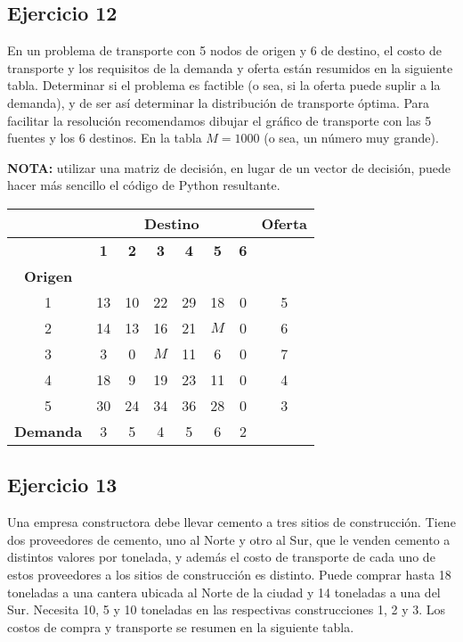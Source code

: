 \documentclass[12pt]{article}
\begin{document}
\subsection{Ejercicio 12}

En un problema de transporte con 5 nodos de origen y 6 de destino, el costo de transporte y los requisitos de la demanda y oferta están resumidos en la siguiente tabla. Determinar si el problema es factible (o sea, si la oferta puede suplir a la demanda), y de ser así determinar la distribución de transporte óptima. Para facilitar la resolución recomendamos dibujar el gráfico de transporte con las 5 fuentes y los 6 destinos. En la tabla \(M = 1000\) (o sea, un número muy grande).

\textbf{NOTA:} utilizar una matriz de decisión, en lugar de un vector de decisión, puede hacer más sencillo el código de Python resultante.

\begin{center}
\begin{tabular}{c|cccccc|c}
\hline
& \multicolumn{6}{c|}{\textbf{Destino}} & \textbf{Oferta} \\
\hline
& \textbf{1} & \textbf{2} & \textbf{3} & \textbf{4} & \textbf{5} & \textbf{6} &  \\
\hline
\textbf{Origen} & & & & & & & \\
1 & 13 & 10 & 22 & 29 & 18 & 0 & 5 \\
2 & 14 & 13 & 16 & 21 & $M$ & 0 & 6 \\
3 & 3 & 0 & $M$ & 11 & 6 & 0 & 7 \\
4 & 18 & 9 & 19 & 23 & 11 & 0 & 4 \\
5 & 30 & 24 & 34 & 36 & 28 & 0 & 3 \\
\hline
\textbf{Demanda} & 3 & 5 & 4 & 5 & 6 & 2 & \\
\hline
\end{tabular}
\end{center}

\subsection{Ejercicio 13}

Una empresa constructora debe llevar cemento a tres sitios de construcción. Tiene dos proveedores de cemento, uno al Norte y otro al Sur, que le venden cemento a distintos valores por tonelada, y además el costo de transporte de cada uno de estos proveedores a los sitios de construcción es distinto. Puede comprar hasta 18 toneladas a una cantera ubicada al Norte de la ciudad y 14 toneladas a una del Sur. Necesita 10, 5 y 10 toneladas en las respectivas construcciones 1, 2 y 3. Los costos de compra y transporte se resumen en la siguiente tabla.
\end{document}

